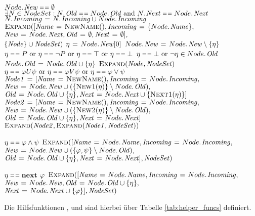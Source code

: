 \begin{codebox}
\li \If $\attrib{Node}{New}\isequal\emptyset$ \Then
\li \If $\exists N\in NodeSet: \attrib{N}{Old}\isequal\attrib{Node}{Old} \mbox{ and } \attrib{N}{Next}\isequal\attrib{Node}{Next}$ \Then
\li $\attrib{N}{Incoming}\gets \attrib{N}{Incoming}\cup\attrib{Node}{Incoming}$
\li \Return {}
\li \Else \Return $\proc{Expand}([\id{Name}\gets \proc{NewName}(),\id{Incoming}\gets \{\attrib{Node}{Name}\},$
\Startalign{\Return $\proc{Expand}([$}
\> $\id{New}\gets\attrib{Node}{Next}, \id{Old}\gets\emptyset, \id{Next}\gets\emptyset],$\\
\> $\{\id{Node}\}\cup \id{NodeSet})$
\Stopalign
\li \Else
\li $\eta\gets \attrib{Node}{New}[0]$
\li $\attrib{Node}{New}\gets\attrib{Node}{New}\setminus\{\eta\}$
\li \If $\eta\isequal P\mbox{ or }\eta\isequal\lnot P\mbox{ or }\eta\isequal\top\mbox{ or }\eta\isequal\bot$ \Then
\li \If $\eta\isequal\bot\mbox{ or }\lnot\eta\in\attrib{Node}{Old}$
\li \Then \Return {}
\li \Else
\li $\attrib{Node}{Old}\gets \attrib{Node}{Old}\cup\{\eta\}$
\li \Return $\proc{Expand}(\id{Node},\id{NodeSet})$
\End
\li \ElseIf $\eta\isequal\varphi U\psi\mbox{ or }\eta\isequal\varphi V\psi\mbox{ or }\eta\isequal\varphi\lor\psi$ \Then
\li $\id{Node1}\gets [\id{Name}\gets\proc{NewName}(),\id{Incoming}\gets\attrib{Node}{Incoming},$
\Startalign{$\id{Node1}\gets [$}
\> $\id{New}\gets\attrib{Node}{New}\cup(\{\proc{New1}(\eta)\}\setminus\attrib{Node}{Old}),$\\
\> $\id{Old}\gets\attrib{Node}{Old}\cup\{\eta\},\id{Next}\gets\attrib{Node}{Next}\cup\{\proc{Next1}(\eta)\}]$
\Stopalign
\li $\id{Node2}\gets [\id{Name}\gets\proc{NewName}(),\id{Incoming}\gets\attrib{Node}{Incoming},$
\Startalign{$\id{Node2}\gets [$}
\> $\id{New}\gets\attrib{Node}{New}\cup(\{\proc{New2}(\eta)\}\setminus\attrib{Node}{Old}),$\\
\> $\id{Old}\gets\attrib{Node}{Old}\cup\{\eta\},\id{Next}\gets\attrib{Node}{Next} ]$
\Stopalign
\li \Return $\proc{Expand}(\id{Node2},\proc{Expand}(\id{Node1},\id{NodeSet}))$

\li \ElseIf $\eta\isequal\varphi\land\psi$\Then
\li \Return $\proc{Expand}([\id{Name}\gets\attrib{Node}{Name},\id{Incoming}\gets\attrib{Node}{Incoming},$
\Startalign{\Return $\proc{Expand}([$}
\> $\id{New}\gets\attrib{Node}{New}\cup(\{\varphi,\psi\}\setminus\attrib{Node}{Old}),$\\
\> $\id{Old}\gets\attrib{Node}{Old}\cup\{\eta\},\id{Next}\gets\attrib{Node}{Next}],\id{NodeSet})$
\Stopalign

\li \ElseIf $\eta\isequal \textbf{next }\varphi$ \Then
\li \Return $\proc{Expand}([\id{Name}\gets\attrib{Node}{Name},\id{Incoming}\gets\attrib{Node}{Incoming},$
\Startalign{\Return $\proc{Expand}([$}
\> $\id{New}\gets\attrib{Node}{New},\id{Old}\gets\attrib{Node}{Old}\cup\{\eta\},$\\
\> $\id{Next}\gets\attrib{Node}{Next}\cup\{\varphi\}],\id{NodeSet})$
\Stopalign
\End
\End
\End
\end{codebox}
Die Hilfsfunktionen ,  und  sind hierbei über Tabelle \ref{tab:helper_funcs} definiert.

